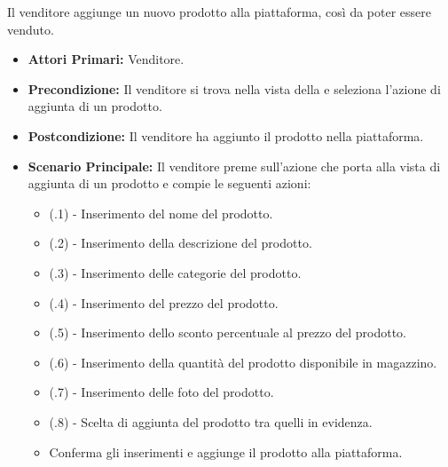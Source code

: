 

Il venditore aggiunge un nuovo prodotto alla piattaforma, così da poter essere venduto.
\begin{itemize}
    \item \textbf{Attori Primari:} Venditore.
    \item \textbf{Precondizione:} Il venditore si trova nella vista della  e seleziona l'azione di aggiunta di un prodotto.
    \item \textbf{Postcondizione:} Il venditore ha aggiunto il prodotto nella piattaforma.
    \item \textbf{Scenario Principale:} Il venditore preme sull'azione che porta alla vista di aggiunta di un prodotto e compie le seguenti azioni:
    \begin{itemize}
        \item (\actualUC.1) - Inserimento del nome del prodotto.
        \item (\actualUC.2) - Inserimento della descrizione del prodotto.
        \item (\actualUC.3) - Inserimento delle categorie del prodotto.
        \item (\actualUC.4) - Inserimento del prezzo del prodotto.
        \item (\actualUC.5) - Inserimento dello sconto percentuale al prezzo del prodotto.
        \item (\actualUC.6) - Inserimento della quantità del prodotto disponibile in magazzino.
        \item (\actualUC.7) - Inserimento delle foto del prodotto.
        \item (\actualUC.8) - Scelta di aggiunta del prodotto tra quelli in evidenza.
        \item Conferma gli inserimenti e aggiunge il prodotto alla piattaforma.
    \end{itemize}
\end{itemize}

